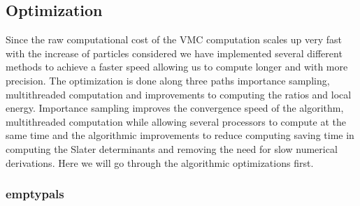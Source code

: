 \subsection{Optimization}
	Since the raw computational cost of the VMC computation scales up very fast with the increase of particles considered we have implemented several different methods to achieve a faster speed allowing us to compute longer and with more precision. The optimization is done along three paths importance sampling, multithreaded computation and improvements to computing the ratios and local energy. Importance sampling improves the convergence speed of the algorithm, multithreaded computation while allowing several processors to compute at the same time and the algorithmic improvements to reduce computing saving time in computing the Slater determinants and removing the need for slow numerical derivations. Here we will go through the algorithmic optimizations first.

	\subsubsection{emptypals}